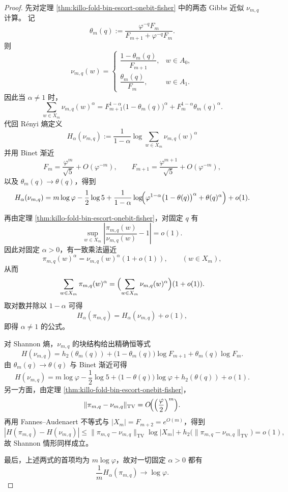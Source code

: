 \begin{proof}
先对定理 \ref{thm:killo-fold-bin-escort-onebit-fisher} 中的两态 Gibbs 近似 \(\nu_{m,q}\) 计算。
记
\[
\theta_m(q):=\frac{\varphi^{-q}F_m}{F_{m+1}+\varphi^{-q}F_m}.
\]
则
\[
\nu_{m,q}(w)=
\begin{cases}
\dfrac{1-\theta_m(q)}{F_{m+1}}, & w\in A_0,\\[2ex]
\dfrac{\theta_m(q)}{F_m}, & w\in A_1.
\end{cases}
\]
因此当 \(\alpha\neq 1\) 时，
\[
\sum_{w\in X_m}\nu_{m,q}(w)^\alpha
=
F_{m+1}^{1-\alpha}\bigl(1-\theta_m(q)\bigr)^\alpha
+
F_m^{1-\alpha}\theta_m(q)^\alpha.
\]
代回 Rényi 熵定义
\[
H_\alpha(\nu_{m,q})
:=
\frac{1}{1-\alpha}\log\sum_{w\in X_m}\nu_{m,q}(w)^\alpha
\]
并用 Binet 渐近
\[
F_m=\frac{\varphi^m}{\sqrt5}+O(\varphi^{-m}),
\qquad
F_{m+1}=\frac{\varphi^{m+1}}{\sqrt5}+O(\varphi^{-m}),
\]
以及 \(\theta_m(q)\to \theta(q)\)，得到
\[
H_\alpha(\nu_{m,q})
=
m\log\varphi
-\frac12\log 5
+\frac{1}{1-\alpha}
\log\!\Bigl(
\varphi^{1-\alpha}\bigl(1-\theta(q)\bigr)^\alpha+\theta(q)^\alpha
\Bigr)
+o(1).
\]

再由定理 \ref{thm:killo-fold-bin-escort-onebit-fisher}，对固定 \(q\) 有
\[
\sup_{w\in X_m}
\left|
\frac{\pi_{m,q}(w)}{\nu_{m,q}(w)}-1
\right|
=o(1).
\]
因此对固定 \(\alpha>0\)，有一致乘法逼近
\[
\pi_{m,q}(w)^\alpha=\nu_{m,q}(w)^\alpha(1+o(1)),
\qquad (w\in X_m),
\]
从而
\[
\sum_{w\in X_m}\pi_{m,q}(w)^\alpha
=
\Bigl(\sum_{w\in X_m}\nu_{m,q}(w)^\alpha\Bigr)(1+o(1)).
\]
取对数并除以 \(1-\alpha\) 可得
\[
H_\alpha(\pi_{m,q})=H_\alpha(\nu_{m,q})+o(1),
\]
即得 \(\alpha\neq 1\) 的公式。

对 Shannon 熵，\(\nu_{m,q}\) 的块结构给出精确恒等式
\[
H(\nu_{m,q})
=
h_2(\theta_m(q))
+\bigl(1-\theta_m(q)\bigr)\log F_{m+1}
+\theta_m(q)\log F_m.
\]
由 \(\theta_m(q)\to\theta(q)\) 与 Binet 渐近可得
\[
H(\nu_{m,q})
=
m\log\varphi
-\frac12\log 5
+\bigl(1-\theta(q)\bigr)\log\varphi
+h_2(\theta(q))
+o(1).
\]
另一方面，由定理 \ref{thm:killo-fold-bin-escort-onebit-fisher}，
\[
\|\pi_{m,q}-\nu_{m,q}\|_{\mathrm{TV}}
=
O\!\Bigl(\Bigl(\frac{\varphi}{2}\Bigr)^m\Bigr).
\]
再用 Fannes--Audenaert 不等式与 \(|X_m|=F_{m+2}=e^{O(m)}\)，得到
\[
|H(\pi_{m,q})-H(\nu_{m,q})|
\le
\|\pi_{m,q}-\nu_{m,q}\|_{\mathrm{TV}}\log|X_m|
+h_2\!\bigl(\|\pi_{m,q}-\nu_{m,q}\|_{\mathrm{TV}}\bigr)
=o(1),
\]
故 Shannon 情形同样成立。

最后，上述两式的首项均为 \(m\log\varphi\)，故对一切固定 \(\alpha>0\) 都有
\[
\frac{1}{m}H_\alpha(\pi_{m,q})\to\log\varphi.
\]
\end{proof}

\endinput
